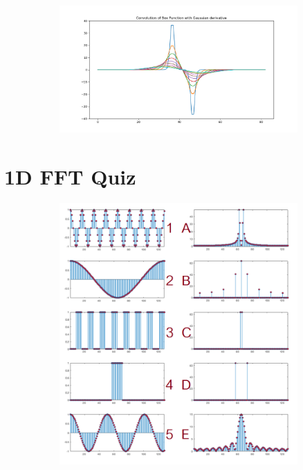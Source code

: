 \documentclass[12pt, oneside]{article}
\begin{document}
\begin{figure}[H]
    \centering
    \begin{subfigure}[b]{1\textwidth}
        \centering
        \includegraphics[width=\textwidth]{imgs/q4_plot.png}
    \end{subfigure}
    \caption{}
\end{figure}

\section{1D FFT Quiz}

\begin{figure}[H]
    \centering
    \begin{subfigure}[b]{1\textwidth}
        \centering
        \includegraphics[width=\textwidth]{imgs/q5_matching.png}
    \end{subfigure}
    \caption{}
\end{figure}
\end{document}
